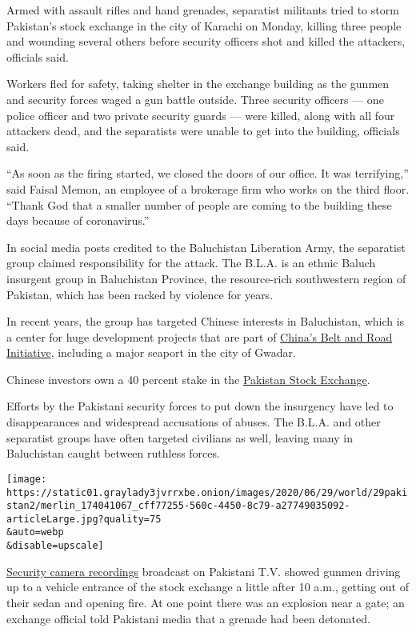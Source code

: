 Armed with assault rifles and hand grenades, separatist militants tried
to storm Pakistan's stock exchange in the city of Karachi on Monday,
killing three people and wounding several others before security
officers shot and killed the attackers, officials said.

Workers fled for safety, taking shelter in the exchange building as the
gunmen and security forces waged a gun battle outside. Three security
officers --- one police officer and two private security guards --- were
killed, along with all four attackers dead, and the separatists were
unable to get into the building, officials said.

``As soon as the firing started, we closed the doors of our office. It
was terrifying,'' said Faisal Memon, an employee of a brokerage firm who
works on the third floor. ``Thank God that a smaller number of people
are coming to the building these days because of coronavirus.''

In social media posts credited to the Baluchistan Liberation Army, the
separatist group claimed responsibility for the attack. The B.L.A. is an
ethnic Baluch insurgent group in Baluchistan Province, the resource-rich
southwestern region of Pakistan, which has been racked by violence for
years.

In recent years, the group has targeted Chinese interests in
Baluchistan, which is a center for huge development projects that are
part of
\href{https://www.nytimes3xbfgragh.onion/2018/12/19/world/asia/pakistan-china-belt-road-military.html}{China's
Belt and Road Initiative}, including a major seaport in the city of
Gwadar.

Chinese investors own a 40 percent stake in the
\href{https://www.psx.com.pk/psx/exchange/profile/about-us}{Pakistan
Stock Exchange}.

Efforts by the Pakistani security forces to put down the insurgency have
led to disappearances and widespread accusations of abuses. The B.L.A.
and other separatist groups have often targeted civilians as well,
leaving many in Baluchistan caught between ruthless forces.

\texttt{[image: https://static01.graylady3jvrrxbe.onion/images/2020/06/29/world/29pakistan2/merlin\_174041067\_cff77255-560c-4450-8c79-a27749035092-articleLarge.jpg?quality=75\\\&auto=webp\\\&disable=upscale]}

\href{https://www.youtube.com/watch?v=Em5hAz9XIUc}{Security camera
recordings} broadcast on Pakistani T.V. showed gunmen driving up to a
vehicle entrance of the stock exchange a little after 10 a.m., getting
out of their sedan and opening fire. At one point there was an explosion
near a gate; an exchange official told Pakistani media that a grenade
had been detonated.

